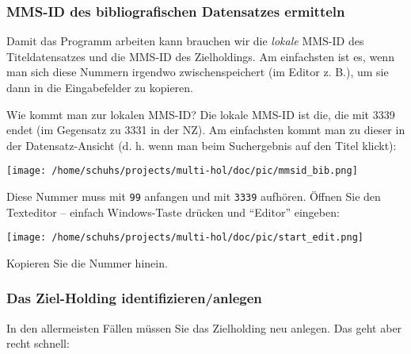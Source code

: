 \documentclass[10pt, a4paper]{scrartcl}
\begin{document}
\subsubsection{MMS-ID des bibliografischen Datensatzes ermitteln}
\label{sec:org5186bcb}
Damit das Programm arbeiten kann brauchen wir die \emph{lokale} MMS-ID des
Titeldatensatzes und die MMS-ID des Zielholdings. Am einfachsten ist es,
wenn man sich diese Nummern irgendwo zwischenspeichert (im Editor z. B.), um
sie dann in die Eingabefelder zu kopieren.

Wie kommt man zur lokalen MMS-ID? Die lokale MMS-ID ist die, die mit 3339
endet (im Gegensatz zu 3331 in der NZ). Am einfachsten kommt man zu dieser
in der Datensatz-Ansicht (d. h. wenn man beim Suchergebnis auf den Titel
klickt):

\begin{center}
\texttt{[image: /home/schuhs/projects/multi-hol/doc/pic/mmsid\_bib.png]}
\end{center}

Diese Nummer muss mit \texttt{99} anfangen und mit \texttt{3339} aufhören. Öffnen Sie
den Texteditor -- einfach Windows-Taste drücken und "`Editor"' eingeben: 

\begin{center}
\texttt{[image: /home/schuhs/projects/multi-hol/doc/pic/start\_edit.png]}
\end{center}

Kopieren Sie die Nummer hinein.
\subsubsection{Das Ziel-Holding identifizieren/anlegen}
\label{sec:org2cf53e8}
In den allermeisten Fällen müssen Sie das Zielholding neu anlegen. Das
geht aber recht schnell:
\end{document}
